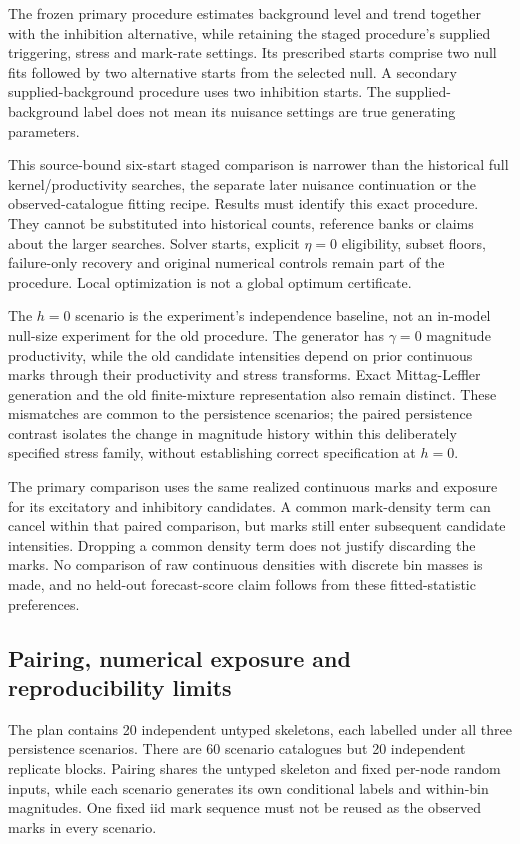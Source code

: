 The frozen primary procedure estimates background level and trend together with the inhibition alternative, while retaining the staged procedure's supplied triggering, stress and mark-rate settings. Its prescribed starts comprise two null fits followed by two alternative starts from the selected null. A secondary supplied-background procedure uses two inhibition starts. The supplied-background label does not mean its nuisance settings are true generating parameters.

This source-bound six-start staged comparison is narrower than the historical full kernel/productivity searches, the separate later nuisance continuation or the observed-catalogue fitting recipe. Results must identify this exact procedure. They cannot be substituted into historical counts, reference banks or claims about the larger searches. Solver starts, explicit $\eta=0$ eligibility, subset floors, failure-only recovery and original numerical controls remain part of the procedure. Local optimization is not a global optimum certificate.

The $h=0$ scenario is the experiment's independence baseline, not an in-model null-size experiment for the old procedure. The generator has $\gamma=0$ magnitude productivity, while the old candidate intensities depend on prior continuous marks through their productivity and stress transforms. Exact Mittag-Leffler generation and the old finite-mixture representation also remain distinct. These mismatches are common to the persistence scenarios; the paired persistence contrast isolates the change in magnitude history within this deliberately specified stress family, without establishing correct specification at $h=0$.

The primary comparison uses the same realized continuous marks and exposure for its excitatory and inhibitory candidates. A common mark-density term can cancel within that paired comparison, but marks still enter subsequent candidate intensities. Dropping a common density term does not justify discarding the marks. No comparison of raw continuous densities with discrete bin masses is made, and no held-out forecast-score claim follows from these fitted-statistic preferences.

\subsection{Pairing, numerical exposure and reproducibility limits}

The plan contains 20 independent untyped skeletons, each labelled under all three persistence scenarios. There are 60 scenario catalogues but 20 independent replicate blocks. Pairing shares the untyped skeleton and fixed per-node random inputs, while each scenario generates its own conditional labels and within-bin magnitudes. One fixed iid mark sequence must not be reused as the observed marks in every scenario.

